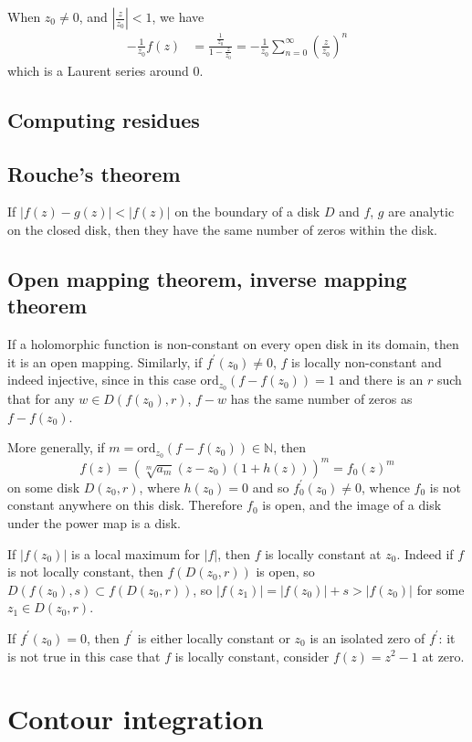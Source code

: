 \documentclass{article}
\newcommand{\ord}{\mathrm{ord}}
\begin{document}
When $z_0 \neq 0$, and $\left| \frac{z}{z_0} \right| < 1$,
we have
\begin{align*}
   -\frac{1}{z_0} f(z)
&=  \frac{\frac{1}{z_0}}
         {1 - \frac{z}{z_0}}
 = -\frac{1}{z_0}
    \sum_{n=0}^\infty
      \left(\frac{z}{z_0}\right)^n
\end{align*}
which is a Laurent series around 0.

\subsection{Computing residues}

\subsection{Rouche's theorem}
If $|f(z) - g(z)| < |f(z)|$ on the boundary of a disk
$D$ and $f$, $g$ are analytic on the closed disk, then they have the
same number of zeros within the disk.

\subsection{Open mapping theorem, inverse mapping theorem}
If a holomorphic function is non-constant on every open disk in its
domain, then it is an open mapping. Similarly, if $f^\prime(z_0) \neq
0$, $f$ is locally non-constant and indeed injective, since in this
case $\ord_{z_0} (f - f(z_0)) = 1$ and there is an
$r$ such that for any $w \in D(f(z_0), r)$, $f - w$ has the same
number of zeros as $f - f(z_0)$.

More generally, if $m = \ord_{z_0} (f - f(z_0)) \in \mathbb{N}$, then
$$
f(z) = (\sqrt[m]{a_m} (z - z_0)(1 + h(z)))^m = f_0(z)^m
$$
on some disk $D(z_0, r)$, where $h(z_0) = 0$ and so $f_0^\prime(z_0)
\neq 0$, whence $f_0$ is not constant anywhere on this disk. Therefore
$f_0$ is open, and the image of a disk under the power map is a disk.

If $|f(z_0)|$ is a local maximum for $|f|$, then $f$ is locally
constant at $z_0$. Indeed if $f$ is not locally constant, then
$f(D(z_0, r))$ is open, so $D(f(z_0), s) \subset f(D(z_0, r))$, so
$|f(z_1)| = |f(z_0)| + s > |f(z_0)|$ for some $z_1 \in D(z_0, r)$.

If $f^\prime(z_0) = 0$, then $f^\prime$ is either locally constant or
$z_0$ is an isolated zero of $f^\prime$: it is not true in this case
that $f$ is locally constant, consider $f(z) = z^2 - 1$ at zero.


\section{Contour integration}
\end{document}

